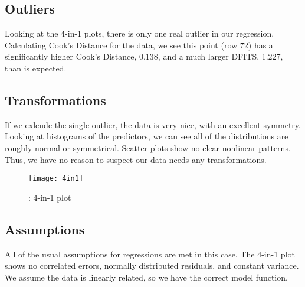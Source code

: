 \documentclass[10pt,letterpaper]{article}
\begin{document}
	\subsection{Outliers}
	Looking at the 4-in-1 plots, there is only one real outlier in our regression. Calculating Cook's Distance for the data, we see this point (row 72) has a significantly higher Cook's Distance, 0.138, and a much larger DFITS, 1.227, than is expected.
	\subsection{Transformations}
	If we exlcude the single outlier, the data is very nice, with an excellent symmetry. Looking at histograms of the predictors, we can see all of the distributions are roughly normal or symmetrical. Scatter plots show no clear nonlinear patterns. Thus, we have no reason to suspect our data needs any transformations.
	\begin{wrapfigure}[8]{r}{0.55\textwidth}
		\texttt{[image: 4in1]}
		\caption{: 4-in-1 plot}
	\end{wrapfigure}
	\subsection{Assumptions}
	All of the usual assumptions for regressions are met in this case. The 4-in-1 plot shows no correlated errors, normally distributed residuals, and constant variance. We assume the data is linearly related, so we have the correct model function. 
	\vspace{3cm}
\end{document}

